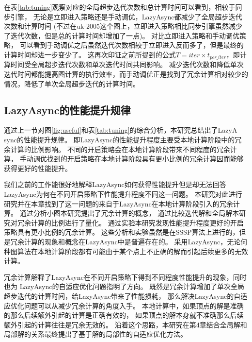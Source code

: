 在表\ref{tab:tuning}观察对应的全局超步迭代次数和总计算时间可以看到，相较于同步引擎，
无论是立即进入策略还是手动调优，LazyAsync都减少了全局超步迭代次数和计算时间
(不过在uk-2005这个图上，立即进入策略相比同步引擎虽然减少了迭代次数，但是总的计算时间却增加了一点)。
对比立即进入策略和手动调优策略， 可以看到手动调优之后虽然迭代次数相较于立即进入反而多了，但是最终的计算时间却进一步变少了。
这再次印证之前所提到的公式$T=iter \times t_{per\_iter}$，即计算时间受全局超步迭代次数和单次迭代时间共同影响。
减少迭代次数和降低单次迭代时间都能提高图计算的执行效率，而手动调优正是找到了冗余计算相对较少的情况，降低了单次全局超步迭代的计算时间。


\subsection{LazyAsync的性能提升规律}

通过上一节对图\ref{fig:useful}和表\ref{tab:tuning}的综合分析，本研究总结出了LazyA sync的性能提升规律。
即LazyAsync的性能提升程度主要受本地计算阶段中的冗余计算的比例影响。
不同的开启策略会在本地计算阶段带来不同程度的冗余计算，
手动调优找到的开启策略在本地计算阶段具有更小比例的冗余计算因而能够获得更好的性能提升。

我们之前的工作能很好地解释LazyAsync如何获得性能提升但是却无法回答LazyAsync为何在不同开启策略下性能提升程度不同这一问题。
本研究对此进行研究并在本章找到了这一问题的来自于LazyAsync在本地计算阶段引入的冗余计算。
通过分析小图本研究提出了冗余计算的概念，
通过比较迭代解和全局解本研究对冗余计算的比例进行了量化。
通过实验本研究发现性能提升程度更好的开启策略具有更小比例的冗余计算。
这些分析和实验虽然是在SSSP算法上进行的，但是冗余计算的现象和概念在LazyAsync中是普遍存在的。
采用LazyAsync，无论何种图算法在本地计算阶段都有可能由于某个点上不正确的解而引起后续更多的无效计算。

冗余计算解释了LazyAsync在不同开启策略下得到不同程度性能提升的现象，同时也为
LazyAsync的自适应优化问题指明了方向。
既然是冗余计算增加了单次全局超步迭代的计算时间，给LazyAsync带来了性能损耗，
那么解决LazyAsync的自适应优化问题可以从减少冗余计算的角度入手。
本地计算中，如果顶点的解是准确的那么后续额外引起的计算是正确有效的，
如果顶点的解本身就不准确那么后续额外引起的计算往往是冗余无效的。
沿着这个思路，本研究在第4章结合全局解和局部解的关系最终提出了基于解的局部性的自适应优化方法。


